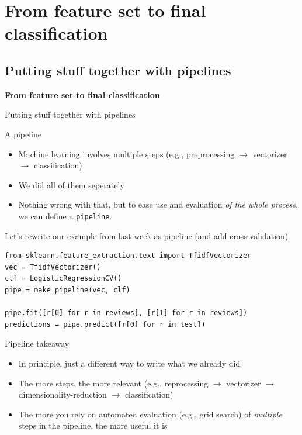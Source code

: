 \documentclass{beamer}
\begin{document}
\section{From feature set to final classification}

\subsection{Putting stuff together with pipelines}
\begin{frame}[plain]
\textbf{From feature set to final classification}

Putting stuff together with pipelines
\end{frame}

\begin{frame}{A pipeline}
\begin{itemize}
	\item Machine learning involves multiple steps (e.g., preprocessing $\rightarrow$ vectorizer $\rightarrow$ classification)
	\item We did all of them seperately
	\item Nothing wrong with that, but to ease use and evaluation \emph{of the whole process}, we can define a \texttt{pipeline}.
\end{itemize}

\end{frame}

\begin{frame}[fragile]{Let's rewrite our example from last week as pipeline (and add cross-validation)}
\begin{lstlisting}
from sklearn.feature_extraction.text import TfidfVectorizer
vec = TfidfVectorizer()
clf = LogisticRegressionCV()
pipe = make_pipeline(vec, clf)

pipe.fit([r[0] for r in reviews], [r[1] for r in reviews])
predictions = pipe.predict([r[0] for r in test])
\end{lstlisting}
\end{frame}

\begin{frame}{Pipeline takeaway}
\begin{itemize}
	\item In principle, just a different way to write what we already did
	\item The more steps, the more relevant (e.g., reprocessing $\rightarrow$ vectorizer $\rightarrow$ dimensionality-reduction $\rightarrow$ classification)
	\item The more you rely on automated evaluation (e.g., grid search) of \emph{multiple} steps in the pipeline, the more useful it is
\end{itemize}
\end{frame}
\end{document}
